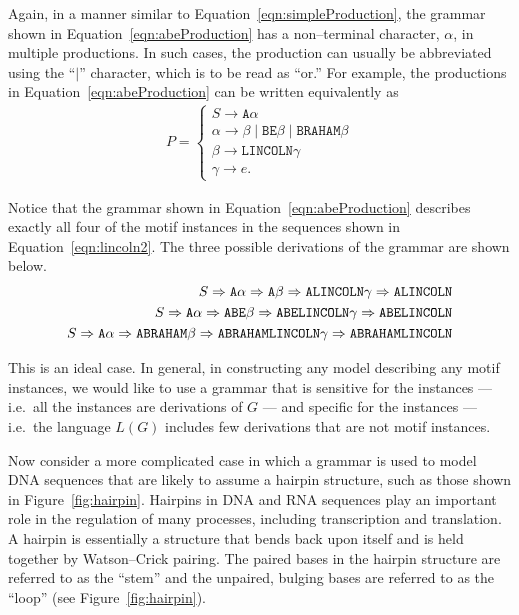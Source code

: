 Again, in a manner similar to Equation~\vref{eqn:simpleProduction},
the grammar shown in Equation~\vref{eqn:abeProduction} has a
non--terminal character, $\alpha$, in multiple productions.  In such
cases, the production can usually be abbreviated using the ``$\mid$''
character, which is to be read as ``or.''  For example, the
productions in Equation~\vref{eqn:abeProduction} can be written
equivalently as
\begin{align}\label{eqn:abeProduction2}
    P =
    \begin{cases}
    S \rightarrow \texttt{A}\alpha \\
    \alpha \rightarrow \beta \mid \texttt{BE}\beta \mid \texttt{BRAHAM}\beta \\
    \beta \rightarrow \texttt{LINCOLN}\gamma \\
    \gamma \rightarrow e.
    \end{cases}
\end{align}

Notice that the grammar shown in Equation~\vref{eqn:abeProduction}
describes exactly all four of the motif instances in the sequences
shown in Equation~\vref{eqn:lincoln2}.  The three possible
derivations of the grammar are shown below.
\begin{align}\label{eqn:abeDerivation}
    S \Rightarrow \texttt{A}\alpha   \Rightarrow \texttt{A}\beta
         \Rightarrow \texttt{ALINCOLN}\gamma  \Rightarrow
        \texttt{ALINCOLN}\\
    S \Rightarrow \texttt{A}\alpha   \Rightarrow \texttt{ABE}\beta
         \Rightarrow \texttt{ABELINCOLN}\gamma  \Rightarrow
        \texttt{ABELINCOLN}\notag\\
    S \Rightarrow \texttt{A}\alpha   \Rightarrow \texttt{ABRAHAM}\beta
        \Rightarrow \texttt{ABRAHAMLINCOLN}\gamma  \Rightarrow
        \texttt{ABRAHAMLINCOLN}\notag
\end{align}

This is an ideal case.  In general, in constructing any model
describing any motif instances, we would like to use a grammar that
is sensitive for the instances
--- i.e.\ all the instances are derivations of $G$ --- and specific
for the instances --- i.e.\ the language $L (G)$ includes few
derivations that are not motif instances.

Now consider a more complicated case in which a grammar is used to
model DNA sequences that are likely to assume a hairpin structure,
such as those shown in Figure~\vref{fig:hairpin}.  Hairpins in DNA
and RNA sequences play an important role in the regulation of many
processes, including transcription and translation.  A hairpin is
essentially a structure that bends back upon itself and is held
together by Watson--Crick pairing.  The paired bases in the hairpin
structure are referred to as the ``stem'' and the unpaired, bulging
bases are referred to as the ``loop'' (see
Figure~\vref{fig:hairpin}).

